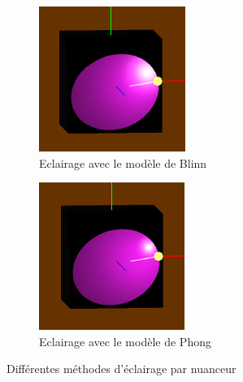 \documentclass[10pt,a4paper]{article}
\begin{document}
\begin{figure}[h!]
\centering
	\begin{subfigure}[c]{0.3\textwidth}
		\includegraphics[width=\textwidth]{images/blinn}
		\caption{Eclairage avec le modèle de Blinn}
	\end{subfigure}
	\begin{subfigure}[c]{0.3\textwidth}
		\includegraphics[width=\textwidth]{images/phong}
		\caption{Eclairage avec le modèle de Phong}
	\end{subfigure}
\caption{Différentes méthodes d'éclairage par nuanceur}
\end{figure}
\end{document}
